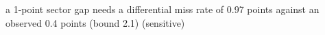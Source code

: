 a 1-point sector gap needs a differential miss rate of 0.97 points against an observed 0.4 points (bound 2.1) (sensitive)